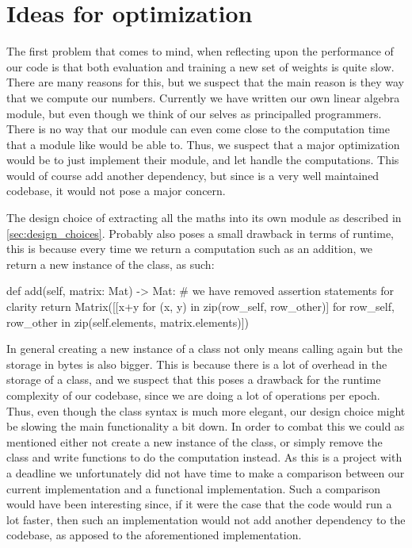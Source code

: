 \documentclass[a4paper,oneside,article,english]{memoir}
\begin{document}
\section{Ideas for optimization}  
\label{sec:ideas_for_optimization}

The first problem that comes to mind, when reflecting upon the performance of
our code is that both evaluation and training a new set of weights is quite
slow. There are many reasons for this, but we suspect that the main reason is
they way that we compute our numbers. Currently we have written our own linear
algebra module, but even though we think of our selves as principalled
programmers. There is no way that our module can even come close to the
computation time that a module like  would be able to. Thus,
we suspect that a major optimization would be to just implement their module,
and let  handle the computations. This would of course
add another dependency, but since  is a very well maintained
codebase, it would not pose a major concern.

The design choice of extracting all the maths into its own module as described
in \cref{sec:design_choices}. Probably also poses a small drawback in terms of
runtime, this is because every time we return a computation such as an addition,
we return a new instance of the class, as such:
\begin{python}
def add(self, matrix: Mat) -> Mat: 
  # we have removed assertion statements for clarity
  return Matrix([[x+y for (x, y) in zip(row_self, row_other)] for row_self, row_other in zip(self.elements, matrix.elements)])
\end{python}
In general creating a new instance of a class not only means calling
 again but the storage in bytes is also bigger.
This is because there is a lot of overhead in the storage of a class, and we
suspect that this poses a drawback for the runtime complexity of our codebase,
since we are doing a lot of operations per epoch. Thus, even though the class
syntax is much more elegant, our design choice might be slowing the main
functionality a bit down. In order to combat this we could as mentioned either
not create a new instance of the class, or simply remove the class and write
functions to do the computation instead. As this is a project with a deadline we
unfortunately did not have time to make a comparison between our current
implementation and a functional implementation. Such a comparison would have
been interesting since, if it were the case that the code would run a lot
faster, then such an implementation would not add another dependency to the
codebase, as apposed to the aforementioned  implementation.





\end{document}
